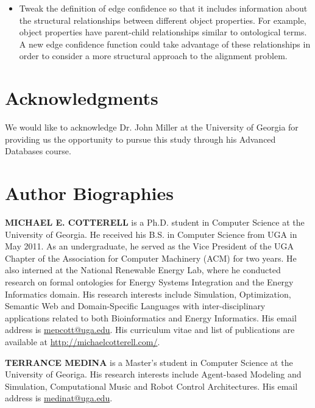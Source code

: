 \documentclass[letterpaper,twocolumn,12pt]{article}
\begin{document}
\begin{itemize}
\item Tweak the definition of edge confidence so that it includes information about the structural relationships between different object properties.
For example, object properties have parent-child relationships similar to ontological terms.
A new edge confidence function could take advantage of these relationships in order to consider a more structural approach to the alignment problem.
\end{itemize}


\section*{Acknowledgments}

We would like to acknowledge Dr. John Miller at the University of Georgia for providing us the opportunity to pursue this study through his Advanced Databases course. 

%

 

\section*{Author Biographies} 
\vspace{8 pt}
\noindent \textbf{MICHAEL E. COTTERELL} is a Ph.D. student in Computer Science at the University of Georgia. 
He received his B.S. in Computer Science from UGA in May 2011. 
As an undergraduate, he served as the Vice President of the UGA Chapter of the Association for Computer Machinery (ACM) for two years. 
He also interned at the National Renewable Energy Lab, where he conducted research on formal ontologies for Energy Systems Integration and the Energy Informatics domain. 
His research interests include Simulation, Optimization, Semantic Web and Domain-Specific Languages with inter-disciplinary applications related to both Bioinformatics and Energy Informatics.
His email address is \href{mailto:mepcott@uga.edu}{mepcott@uga.edu}.
His curriculum vitae and list of publications are available at \url{http://michaelcotterell.com/}.

\vspace{8 pt}
\noindent \textbf{TERRANCE MEDINA} is a Master's student in Computer Science at the University of Georiga.  
His research interests include Agent-based Modeling and Simulation, Computational Music and Robot Control Architectures.
His email address is \href{mailto:medinat@uga.edu}{medinat@uga.edu}.
\end{document}

